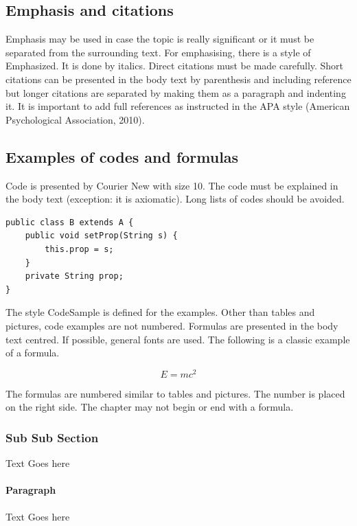 \documentclass[a4paper,12pt]{article}
\begin{document}
\subsection{Emphasis and citations}
Emphasis may be used in case the topic is really significant or it must be separated from the surrounding text. For emphasising, there is a style of Emphasized. It is done by italics.
Direct citations must be made carefully. Short citations can be presented in the body text by parenthesis and including reference but longer citations are separated by making them as a paragraph and indenting it. It is important to add full references as instructed in the APA style (American Psychological Association, 2010).

\subsection{Examples of codes and formulas}
Code is presented by Courier New with size 10. The code must be explained in the body text (exception: it is axiomatic). Long lists of codes should be avoided.

\begin{verbatim}
public class B extends A {	
    public void setProp(String s) {
        this.prop = s;
    }
    private String prop;
}
\end{verbatim}

The style CodeSample is defined for the examples. Other than tables and pictures, code examples are not numbered.
Formulas are presented in the body text centred. If possible, general fonts are used. The following is a classic example of a formula.

\begin{equation}
    E = mc^2
\end{equation}

The formulas are numbered similar to tables and pictures. The number is placed on the right side. The chapter may not begin or end with a formula.
\subsubsection{Sub Sub Section}
Text Goes here

\paragraph{Paragraph}
Text Goes here

\newpage

\printbibliography[heading=bibintoc] %
\nocite{*}
\end{document}

